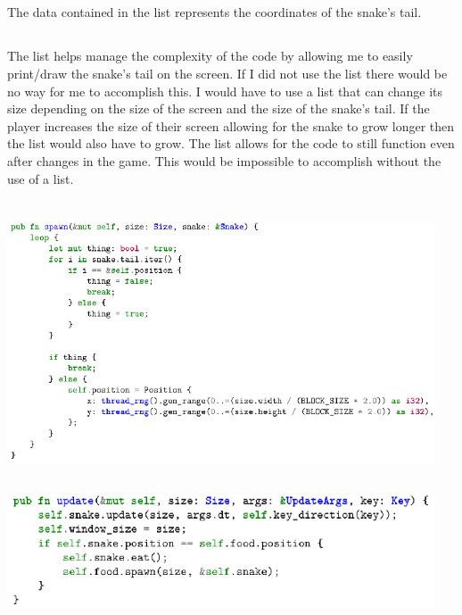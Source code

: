 \documentclass{article}
\begin{document}
\subsection{}
The data contained in the list represents the coordinates of the snake’s tail.
\subsection{}
The list helps manage the complexity of the code by allowing me to easily print/draw the snake’s tail on the screen. If I did not use the list there would be no way for me to accomplish this. I would have to use a list that can change its size depending on the size of the screen and the size of the snake’s tail. If the player increases the size of their screen allowing for the snake to grow longer then the list would also have to grow. The list allows for the code to still function even after changes in the game. This would be impossible to accomplish without the use of a list.

\section{}
\subsection{}
\includegraphics[width=5in]{3ci}
\subsection{}
\includegraphics[width=5in]{3cii}
\end{document}

